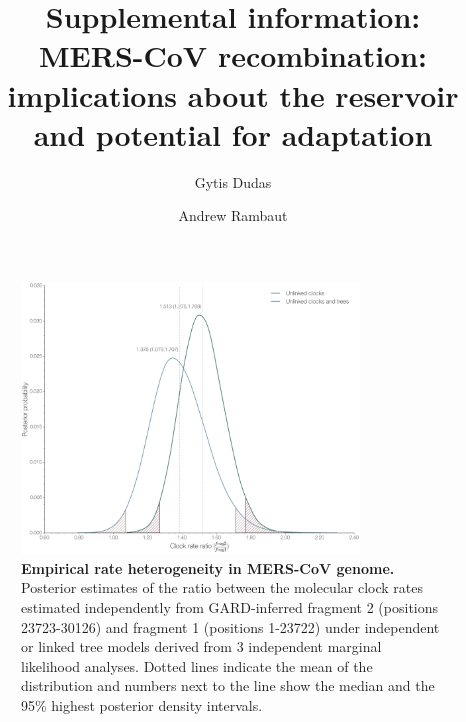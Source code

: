 \documentclass[11pt,oneside,letterpaper]{article}
\begin{document}
\title{\vspace{1.0cm} \huge \bf Supplemental information:\\ \LARGE MERS-CoV recombination: implications about the reservoir and potential for adaptation}

\author[1]{Gytis Dudas}
\author[1,2,3]{Andrew Rambaut}



\maketitle

\setcounter{figure}{0}
\setcounter{table}{0}
\renewcommand{\thefigure}{S\arabic{figure}}
\renewcommand{\thetable}{S\arabic{table}}

\begin{figure}[h]
	\centering	
	\includegraphics[width=0.8\textwidth]{figures/supp_MERS_empiricalHeterogeneity.png}
	\caption{\textbf{Empirical rate heterogeneity in MERS-CoV genome.}
Posterior estimates of the ratio between the molecular clock rates estimated independently from GARD-inferred fragment 2 (positions 23723-30126) and fragment 1 (positions 1-23722) under independent or linked tree models derived from 3 independent marginal likelihood analyses.
Dotted lines indicate the mean of the distribution and numbers next to the line show the median and the 95\% highest posterior density intervals.}
	\label{rateHet}
\end{figure}
\end{document}

